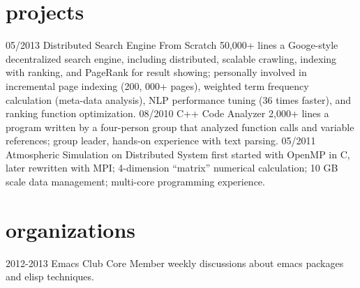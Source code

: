 \documentclass[print]{friggeri-cv}
\begin{document}
\section{projects}
\begin{entrylist}
  \entry
  {05/2013}
  {Distributed Search Engine From Scratch}
  {50,000+ lines}
  {a Googe-style decentralized search engine, including distributed, scalable crawling, indexing with ranking, and PageRank for result showing; personally involved in incremental page indexing (200, 000+ pages), weighted term frequency calculation (meta-data analysis), NLP performance tuning (36 times faster), and ranking function optimization.}
  \entry
  {08/2010}
  {C++ Code Analyzer}
  {2,000+ lines}
  {a program written by a four-person group that analyzed function calls and variable references; group leader, hands-on experience with text parsing.}
  \entry
  {05/2011}
  {Atmospheric Simulation on Distributed System}
  {}
  {first started with OpenMP in C, later rewritten with MPI; 4-dimension “matrix” numerical calculation; 10 GB scale data management; multi-core programming experience.}
\end{entrylist}
\section{organizations}
\begin{entrylist}
  \entry
  {2012-2013}
  {Emacs Club}
  {Core Member}
  {weekly discussions about emacs packages and elisp techniques.}
\end{entrylist}
\end{document}
